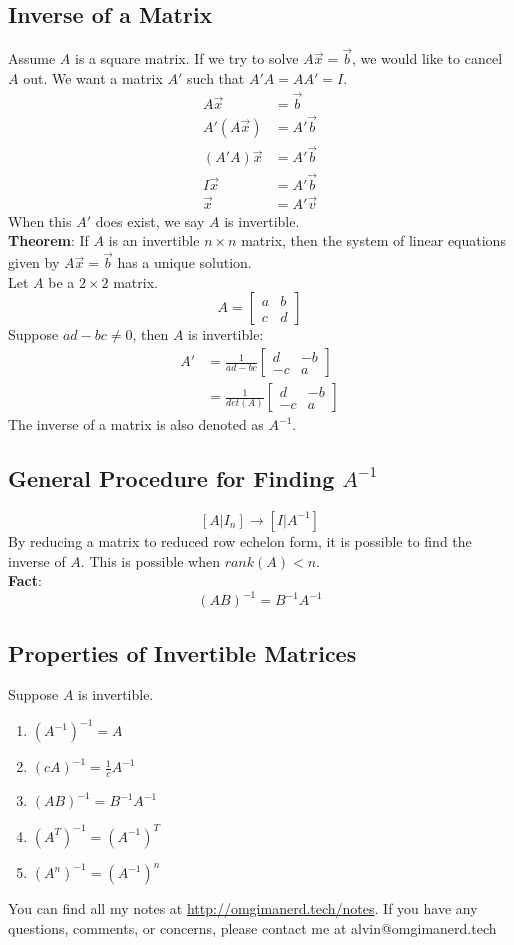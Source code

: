 \documentclass{math}
\begin{document}
\subsection*{Inverse of a Matrix}
Assume \( A \) is a square matrix. If we try to solve \( A\vec{x} = \vec{b} \),
we would like to cancel \( A \) out. We want a matrix \( A' \) such that
\( A'A = AA' = I \).
\begin{align*}
  A\vec{x} &= \vec{b} \\
  A'(A\vec{x}) &= A'\vec{b} \\
  (A'A)\vec{x} &= A'\vec{b} \\
  I\vec{x} &= A'\vec{b} \\
  \vec{x} &= A'\vec{v}
\end{align*}
When this \( A' \) does exist, we say \( A \) is invertible. \\
\textbf{Theorem}: If \( A \) is an invertible \( n\times n \) matrix, then the
system of linear equations given by \( A\vec{x} = \vec{b} \) has a unique
solution. \\
Let \( A \) be a \( 2\times2 \) matrix.
\[ A = \begin{bmatrix}a & b \\ c & d\end{bmatrix} \]
Suppose \( ad-bc \ne 0 \), then \( A \) is invertible:
\begin{align*}
  A' &= \frac{1}{ad-bc}\begin{bmatrix}d & -b \\ -c & a\end{bmatrix} \\
  &= \frac{1}{det(A)}\begin{bmatrix}d & -b \\ -c & a\end{bmatrix}
\end{align*}
The inverse of a matrix is also denoted as \( A^{-1} \).

\subsection*{General Procedure for Finding \( A^{-1} \)}
\[ [A|I_n] \rightarrow [I|A^{-1}] \]
By reducing a matrix to reduced row echelon form, it is possible to find the
inverse of \( A \). This is possible when \( rank(A) < n \). \\
\textbf{Fact}:
\[ (AB)^{-1} = B^{-1}A^{-1} \]

\subsection*{Properties of Invertible Matrices}
Suppose \( A \) is invertible.
\begin{enumerate}
  \item \( (A^{-1})^{-1} = A \)
  \item \( (cA)^{-1} = \frac{1}{c}A^{-1} \)
  \item \( (AB)^{-1} = B^{-1}A^{-1} \)
  \item \( (A^T)^{-1} = (A^{-1})^T \)
  \item \( (A^n)^{-1} = (A^{-1})^n \)
\end{enumerate}

\begin{center}
  You can find all my notes at \url{http://omgimanerd.tech/notes}. If you have
  any questions, comments, or concerns, please contact me at
  alvin@omgimanerd.tech
\end{center}
\end{document}
